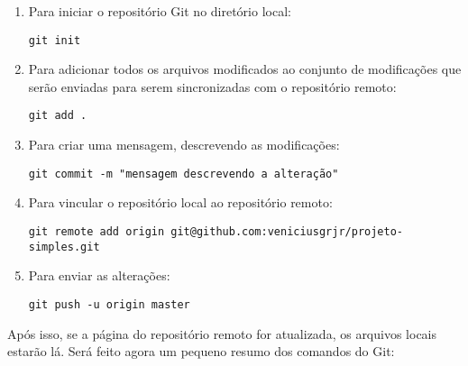 \begin{enumerate}
   \item Para iniciar o repositório Git no diretório local:
      \begin{lstlisting}
git init
      \end{lstlisting}
      
   \item Para adicionar todos os arquivos modificados ao 
   conjunto de modificações que serão enviadas para serem 
   sincronizadas com o repositório remoto: 
      \begin{lstlisting}
git add . 
      \end{lstlisting}
   
   \item Para criar uma mensagem, descrevendo as modificações: 
      \begin{lstlisting}
git commit -m "mensagem descrevendo a alteração"
      \end{lstlisting}
      
   \item Para vincular o repositório local ao repositório remoto: 
      \begin{lstlisting}
git remote add origin git@github.com:veniciusgrjr/projeto-simples.git
      \end{lstlisting}
      
    \item Para enviar as alterações: 
      \begin{lstlisting}
git push -u origin master
      \end{lstlisting}
	
 \end{enumerate}

Após isso, se a página do repositório remoto for atualizada, os 
arquivos locais estarão lá. Será feito agora um pequeno resumo 
dos comandos do Git:

